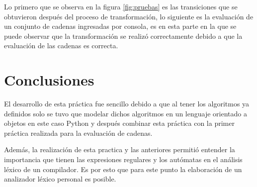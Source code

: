 \documentclass[titlepage]{article}
\begin{document}
    Lo primero que se observa en la figura \ref{fig:pruebas} es las transiciones que se obtuvieron después del proceso de transformación, lo siguiente es la evaluación de un conjunto de cadenas ingresadas por consola, es en esta parte en la que se puede observar que la transformación se realizó correctamente debido a que la evaluación de las cadenas es correcta.
\section{Conclusiones}
    El desarrollo de esta práctica fue sencillo debido a que al tener los algoritmos ya definidos \cite{compis} solo se tuvo que modelar dichos algoritmos en un lenguaje orientado a objetos en este caso Python y después combinar esta práctica con la primer práctica realizada para la evaluación de cadenas. 
    
    Además, la realización de esta practica y las anteriores permitió entender la importancia que tienen las expresiones regulares y los autómatas en el análisis léxico de un compilador. Es por esto que para este punto la elaboración de un analizador léxico personal es posible.
     
    
\end{document}
